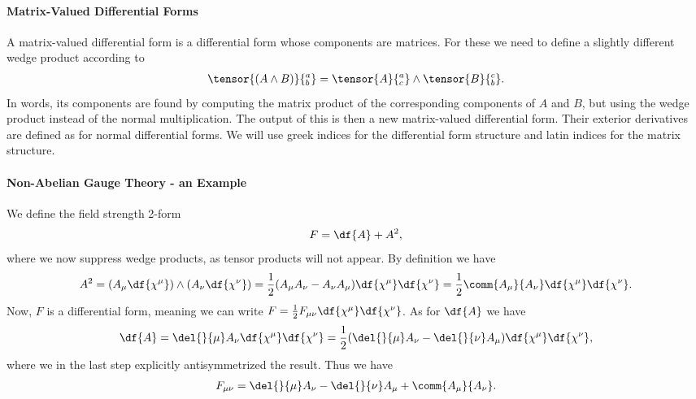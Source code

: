 \paragraph{Matrix-Valued Differential Forms}
A matrix-valued differential form is a differential form whose components are matrices. For these we need to define a slightly different wedge product according to
\begin{align*}
	\tensor{(A\wedge B)}{^{a}_{b}} = \tensor{A}{^{a}_{c}}\wedge\tensor{B}{^{c}_{b}}.
\end{align*}
In words, its components are found by computing the matrix product of the corresponding components of $A$ and $B$, but using the wedge product instead of the normal multiplication. The output of this is then a new matrix-valued differential form. Their exterior derivatives are defined as for normal differential forms. We will use greek indices for the differential form structure and latin indices for the matrix structure.

\paragraph{Non-Abelian Gauge Theory - an Example}
We define the field strength 2-form
\begin{align*}
	F = \df{A} + A^{2},
\end{align*}
where we now suppress wedge products, as tensor products will not appear. By definition we have
\begin{align*}
	A^{2} = (A_{\mu}\df{\chi^{\mu}})\wedge(A_{\nu}\df{\chi^{\nu}}) = \frac{1}{2}(A_{\mu}A_{\nu} - A_{\nu}A_{\mu})\df{\chi^{\mu}}\df{\chi^{\nu}} = \frac{1}{2}\comm{A_{\mu}}{A_{\nu}}\df{\chi^{\mu}}\df{\chi^{\nu}}.
\end{align*}
Now, $F$ is a differential form, meaning we can write $F = \frac{1}{2}F_{\mu\nu}\df{\chi^{\mu}}\df{\chi^{\nu}}$. As for $\df{A}$ we have
\begin{align*}
	\df{A} = \del{}{\mu}A_{\nu}\df{\chi^{\mu}}\df{\chi^{\nu}} = \frac{1}{2}(\del{}{\mu}A_{\nu} - \del{}{\nu}A_{\mu})\df{\chi^{\mu}}\df{\chi^{\nu}},
\end{align*}
where we in the last step explicitly antisymmetrized the result. Thus we have
\begin{align*}
	F_{\mu\nu} = \del{}{\mu}A_{\nu} - \del{}{\nu}A_{\mu} + \comm{A_{\mu}}{A_{\nu}}.
\end{align*}

